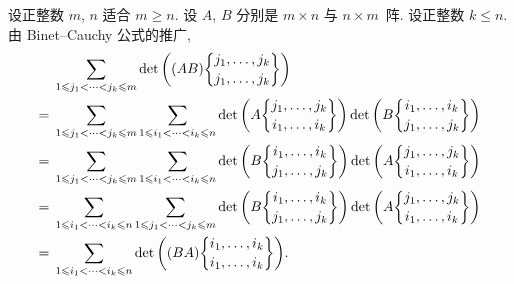 \documentclass[../libro.tex]{subfiles}
\begin{document}
\begin{example}\label{emp:sum-of-principal-minors-of-AB-and-that-of-BA}
    设正整数 \(m\), \(n\) 适合 \(m \geq n\).
    设 \(A\), \(B\) 分别是 \(m \times n\) 与 \(n \times m\)~阵.
    设正整数 \(k \leq n\).
    由 Binet--Cauchy 公式的推广,
    \begin{align*}
        &
        \sum_{1 \leq j_1 < \dots < j_k \leq m}
        \det {\left(
                (AB)\submat{j_1,\dots,j_k}{j_1,\dots,j_k}
        \right)}
        \\
        = {} &
        \sum_{1 \leq j_1 < \dots < j_k \leq m}
        \sum_{1 \leq i_1 < \dots < i_k \leq n}
        \det {\left(
                A\submat{j_1,\dots,j_k}{i_1,\dots,i_k}
        \right)}
        \det {\left(
                B\submat{i_1,\dots,i_k}{j_1,\dots,j_k}
        \right)}
        \\
        = {} &
        \sum_{1 \leq j_1 < \dots < j_k \leq m}
        \sum_{1 \leq i_1 < \dots < i_k \leq n}
        \det {\left(
                B\submat{i_1,\dots,i_k}{j_1,\dots,j_k}
        \right)}
        \det {\left(
                A\submat{j_1,\dots,j_k}{i_1,\dots,i_k}
        \right)}
        \\
        = {} &
        \sum_{1 \leq i_1 < \dots < i_k \leq n}
        \sum_{1 \leq j_1 < \dots < j_k \leq m}
        \det {\left(
                B\submat{i_1,\dots,i_k}{j_1,\dots,j_k}
        \right)}
        \det {\left(
                A\submat{j_1,\dots,j_k}{i_1,\dots,i_k}
        \right)}
        \\
        = {} &
        \sum_{1 \leq i_1 < \dots < i_k \leq n}
        \det {\left(
                (BA)\submat{i_1,\dots,i_k}{i_1,\dots,i_k}
        \right)}.
        \qefhere
    \end{align*}
\end{example}
\end{document}
